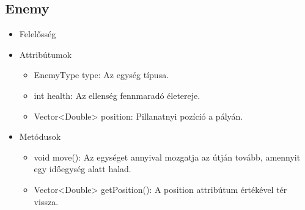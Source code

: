 \subsection{Enemy}
\begin{itemize}
\item Felelősség\\

\item Attribútumok\\
	\begin{itemize}
		\item EnemyType type: Az egység típusa.
		\item int health: Az ellenség fennmaradó életereje.
		\item Vector<Double> position: Pillanatnyi pozíció a pályán.
	\end{itemize}
\item Metódusok\\
	\begin{itemize}
		\item void move(): Az egységet annyival mozgatja az útján tovább, amennyit egy időegység alatt halad.
		\item Vector<Double> getPosition(): A position attribútum értékével tér vissza.
	\end{itemize}
\end{itemize}

